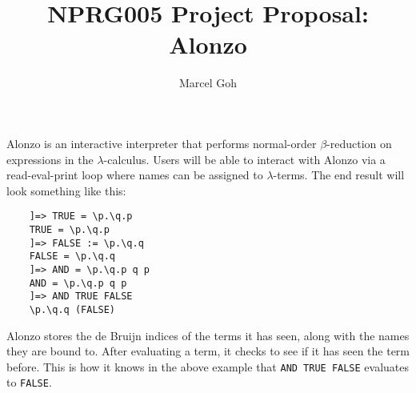 \documentclass[11pt]{article}
\begin{document}
 
\title{\textbf{NPRG005 Project Proposal: Alonzo}}
\author{Marcel Goh}
\maketitle

Alonzo is an interactive interpreter that performs normal-order $\beta$-reduction on expressions in the $\lambda$-calculus. Users will be able to interact with Alonzo via a read-eval-print loop where names can be assigned to $\lambda$-terms. The end result will look something like this:

\begin{lstlisting}
    ]=> TRUE = \p.\q.p
    TRUE = \p.\q.p
    ]=> FALSE := \p.\q.q
    FALSE = \p.\q.q
    ]=> AND = \p.\q.p q p
    AND = \p.\q.p q p
    ]=> AND TRUE FALSE
    \p.\q.q (FALSE)
\end{lstlisting}

Alonzo stores the de Bruijn indices of the terms it has seen, along with the names they are bound to. After evaluating a term, it checks to see if it has seen the term before. This is how it knows in the above example that \texttt{AND TRUE FALSE} evaluates to \texttt{FALSE}.
\end{document}
